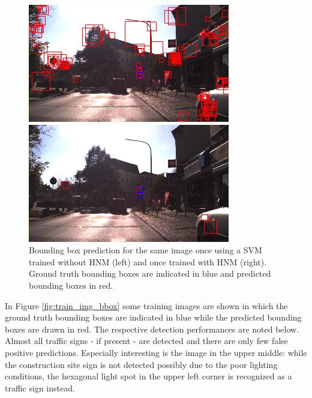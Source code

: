 \documentclass[12pt,a4paper,bibliography=totocnumbered,listof=totocnumbered]{scrartcl}
\begin{document}
\begin{figure}[H]
\begin{minipage}{0.48\textwidth}
\centering
\includegraphics[width=\linewidth]{train102_wo_hn_prediction.png}
\end{minipage}
\hfill
\begin{minipage}{0.48\textwidth}
\centering
\includegraphics[width=\linewidth]{train102_predboxes2.png}
\end{minipage}
\caption{Bounding box prediction for the same image once using a SVM trained without HNM (left) and once trained with HNM (right). Ground truth bounding boxes are indicated in blue and predicted bounding boxes in red.}\label{fig:compar}
\end{figure}

In Figure \ref{fig:train_img_bbox} some training images are shown in which the ground truth bounding boxes are indicated in blue while the predicted bounding boxes are drawn in red. The respective detection performances are noted below. Almost all traffic signs - if present - are detected and there are only few false positive predictions. Especially interesting is the image in the upper middle: while the construction site sign is not detected possibly due to the poor lighting conditions, the hexagonal light spot in the upper left corner is recognized as a traffic sign instead. 
\end{document}
